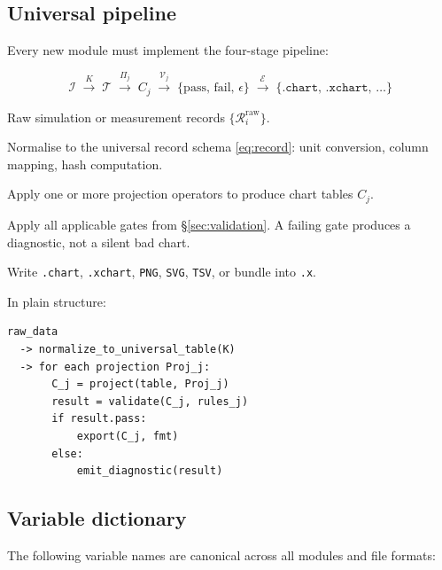 \documentclass[11pt, a4paper, oneside]{article}
\newcommand{\Rec}{\mathcal{R}}           %
\newcommand{\Tab}{\mathcal{T}}           %
\newcommand{\Proj}{\Pi}                  %
\newcommand{\Val}{\mathcal{V}}           %
\begin{document}
\subsection{Universal pipeline}

Every new module must implement the four-stage pipeline:

\begin{equation}
  \mathcal{I} \;\xrightarrow{K}\; \Tab
                \;\xrightarrow{\Proj_j}\; C_j
                \;\xrightarrow{\Val_j}\; \{\mathrm{pass},\,\mathrm{fail},\,\epsilon\}
                \;\xrightarrow{\mathcal{E}}\; \{\texttt{.chart},\,\texttt{.xchart},\,\ldots\}
  \label{eq:pipeline}
\end{equation}

\begin{description}[leftmargin=2em]
  \item[Input $\mathcal{I}$] Raw simulation or measurement records
    $\{\Rec_i^{\mathrm{raw}}\}$.
  \item[Transform $K$] Normalise to the universal record schema
    \eqref{eq:record}: unit conversion, column mapping, hash computation.
  \item[Project $\Proj_j$] Apply one or more projection operators to produce
    chart tables $C_j$.
  \item[Validate $\Val_j$] Apply all applicable gates from \S\ref{sec:validation}.
    A failing gate produces a diagnostic, not a silent bad chart.
  \item[Export $\mathcal{E}$] Write \texttt{.chart}, \texttt{.xchart},
    \texttt{PNG}, \texttt{SVG}, \texttt{TSV}, or bundle into \texttt{.x}.
\end{description}

In plain structure:

\begin{lstlisting}[caption={Universal pipeline pseudocode.}]
raw_data
  -> normalize_to_universal_table(K)
  -> for each projection Proj_j:
       C_j = project(table, Proj_j)
       result = validate(C_j, rules_j)
       if result.pass:
           export(C_j, fmt)
       else:
           emit_diagnostic(result)
\end{lstlisting}

\subsection{Variable dictionary}

The following variable names are canonical across all modules and file formats:
\end{document}
